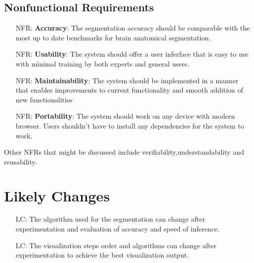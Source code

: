 \documentclass[12pt]{article}
\newcounter{nfrnum} %
\newcounter{lcnum} %
\begin{document}
\subsection{Nonfunctional Requirements}

\noindent \begin{itemize}

  \item[NFR\refstepcounter{nfrnum}\thenfrnum \label{NFR_Accuracy}:]
        \textbf{Accuracy}: The segmentation accuracy should be comparable with the most up to date benchmarks for brain anatomical segmentation.

  \item[NFR\refstepcounter{nfrnum}\thenfrnum \label{NFR_Usability}:] \textbf{Usability}: The system should offer a user inferface that is easy to use with minimal
        training by both experts and general users.


  \item[NFR\refstepcounter{nfrnum}\thenfrnum \label{NFR_Maintainability}:]
        \textbf{Maintainability}: The system should be implemented in a manner that enables improvements to current functionality and smooth addition of new functionalities

  \item[NFR\refstepcounter{nfrnum}\thenfrnum \label{NFR_Portability}:]
        \textbf{Portability}: The system should work on any device with modern browser. Users shouldn't have to install any dependencies for the system to work.

\end{itemize}
Other NFRs that might be discussed include verifiability,understandability
and reusability.

\section{Likely Changes}

\noindent \begin{itemize}

  \item[LC\refstepcounter{lcnum}\thelcnum\label{LC1}:] The algorithm used for the segmentation can change
        after experimentation and evaluation of accuracy and speed of inference.
  \item[LC\refstepcounter{lcnum}\thelcnum\label{LC2}:] The visualization steps order and algorithms can change after
        experimentation to achieve the best visualization output.

\end{itemize}
\end{document}
